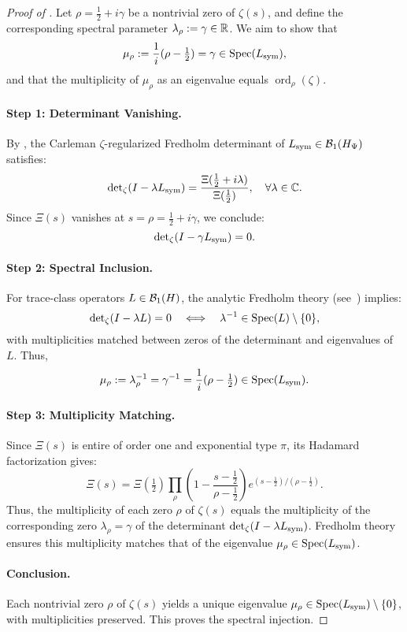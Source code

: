 \begin{proof}[Proof of ]
Let \( \rho = \tfrac{1}{2} + i\gamma \) be a nontrivial zero of \( \zeta(s) \), and define the corresponding spectral parameter \( \lambda_\rho := \gamma \in \mathbb{R} \). We aim to show that
\[
\mu_\rho := \frac{1}{i}(\rho - \tfrac{1}{2}) = \gamma \in \operatorname{Spec}(L_{\mathrm{sym}}),
\]
and that the multiplicity of \( \mu_\rho \) as an eigenvalue equals \( \operatorname{ord}_\rho(\zeta) \).

\paragraph{Step 1: Determinant Vanishing.}
By , the Carleman \(\zeta\)-regularized Fredholm determinant of \( L_{\mathrm{sym}} \in \mathcal{B}_1(H_{\Psi}) \) satisfies:
\[
\det\nolimits_{\zeta}(I - \lambda L_{\mathrm{sym}}) = \frac{\Xi(\tfrac{1}{2} + i\lambda)}{\Xi(\tfrac{1}{2})},
\quad \forall \lambda \in \mathbb{C}.
\]
Since \( \Xi(s) \) vanishes at \( s = \rho = \tfrac{1}{2} + i\gamma \), we conclude:
\[
\det\nolimits_{\zeta}(I - \gamma L_{\mathrm{sym}}) = 0.
\]

\paragraph{Step 2: Spectral Inclusion.}
For trace-class operators \( L \in \mathcal{B}_1(H) \), the analytic Fredholm theory (see~\cite[Thm.~3.1]{Simon2005TraceIdeals}) implies:
\[
\det\nolimits_{\zeta}(I - \lambda L) = 0 \quad \Longleftrightarrow \quad \lambda^{-1} \in \operatorname{Spec}(L) \setminus \{0\},
\]
with multiplicities matched between zeros of the determinant and eigenvalues of \( L \). Thus,
\[
\mu_\rho := \lambda_\rho^{-1} = \gamma^{-1} = \frac{1}{i}(\rho - \tfrac{1}{2}) \in \operatorname{Spec}(L_{\mathrm{sym}}).
\]

\paragraph{Step 3: Multiplicity Matching.}
Since \( \Xi(s) \) is entire of order one and exponential type \( \pi \), its Hadamard factorization gives:
\[
\Xi(s) = \Xi(\tfrac{1}{2}) \prod_\rho \left(1 - \frac{s - \tfrac{1}{2}}{\rho - \tfrac{1}{2}} \right) 
e^{(s - \tfrac{1}{2}) / (\rho - \tfrac{1}{2})}.
\]
Thus, the multiplicity of each zero \( \rho \) of \( \zeta(s) \) equals the multiplicity of the corresponding zero \( \lambda_\rho = \gamma \) of the determinant \( \det\nolimits_{\zeta}(I - \lambda L_{\mathrm{sym}}) \). Fredholm theory ensures this multiplicity matches that of the eigenvalue \( \mu_\rho \in \operatorname{Spec}(L_{\mathrm{sym}}) \).

\paragraph{Conclusion.}
Each nontrivial zero \( \rho \) of \( \zeta(s) \) yields a unique eigenvalue \( \mu_\rho \in \operatorname{Spec}(L_{\mathrm{sym}}) \setminus \{0\} \), with multiplicities preserved. This proves the spectral injection.
\end{proof}
